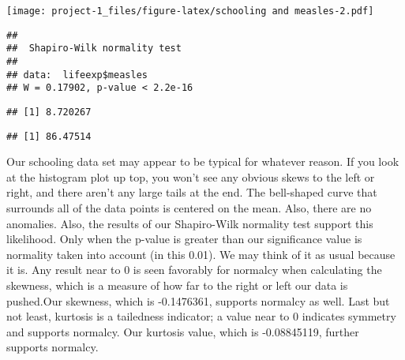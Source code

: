 \documentclass[
]{article}
\newenvironment{Shaded}{\begin{snugshade}}{\end{snugshade}}
\newcommand{\AttributeTok}[1]{\textcolor[rgb]{0.77,0.63,0.00}{#1}}
\newcommand{\DecValTok}[1]{\textcolor[rgb]{0.00,0.00,0.81}{#1}}
\newcommand{\FunctionTok}[1]{\textcolor[rgb]{0.00,0.00,0.00}{#1}}
\newcommand{\NormalTok}[1]{#1}
\newcommand{\SpecialCharTok}[1]{\textcolor[rgb]{0.00,0.00,0.00}{#1}}
\begin{document}
\texttt{[image: project-1\_files/figure-latex/schooling and measles-2.pdf]}

\begin{Shaded}
\end{Shaded}

\begin{verbatim}
## 
##  Shapiro-Wilk normality test
## 
## data:  lifeexp$measles
## W = 0.17902, p-value < 2.2e-16
\end{verbatim}

\begin{Shaded}
\end{Shaded}

\begin{verbatim}
## [1] 8.720267
\end{verbatim}

\begin{Shaded}
\end{Shaded}

\begin{verbatim}
## [1] 86.47514
\end{verbatim}

Our schooling data set may appear to be typical for whatever reason. If
you look at the histogram plot up top, you won't see any obvious skews
to the left or right, and there aren't any large tails at the end. The
bell-shaped curve that surrounds all of the data points is centered on
the mean. Also, there are no anomalies. Also, the results of our
Shapiro-Wilk normality test support this likelihood. Only when the
p-value is greater than our significance value is normality taken into
account (in this 0.01). We may think of it as usual because it is. Any
result near to 0 is seen favorably for normalcy when calculating the
skewness, which is a measure of how far to the right or left our data is
pushed.Our skewness, which is -0.1476361, supports normalcy as well.
Last but not least, kurtosis is a tailedness indicator; a value near to
0 indicates symmetry and supports normalcy. Our kurtosis value, which is
-0.08845119, further supports normalcy.
\end{document}
